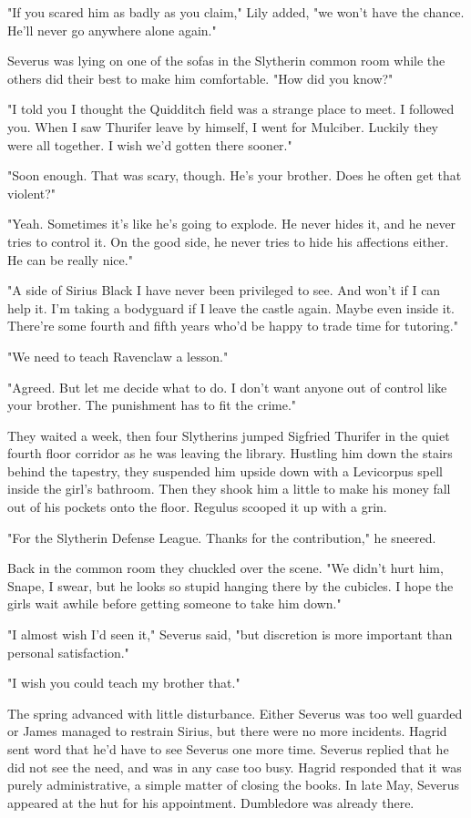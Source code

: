 "If you scared him as badly as you claim," Lily added, "we won't have the chance. He'll never go anywhere alone again."

Severus was lying on one of the sofas in the Slytherin common room while the others did their best to make him comfortable. "How did you know?"

"I told you I thought the Quidditch field was a strange place to meet. I followed you. When I saw Thurifer leave by himself, I went for Mulciber. Luckily they were all together. I wish we'd gotten there sooner."

"Soon enough. That was scary, though. He's your brother. Does he often get that violent?"

"Yeah. Sometimes it's like he's going to explode. He never hides it, and he never tries to control it. On the good side, he never tries to hide his affections either. He can be really nice."

"A side of Sirius Black I have never been privileged to see. And won't if I can help it. I'm taking a bodyguard if I leave the castle again. Maybe even inside it. There're some fourth and fifth years who'd be happy to trade time for tutoring."

"We need to teach Ravenclaw a lesson."

"Agreed. But let me decide what to do. I don't want anyone out of control like your brother. The punishment has to fit the crime."

They waited a week, then four Slytherins jumped Sigfried Thurifer in the quiet fourth floor corridor as he was leaving the library. Hustling him down the stairs behind the tapestry, they suspended him upside down with a Levicorpus spell inside the girl's bathroom. Then they shook him a little to make his money fall out of his pockets onto the floor. Regulus scooped it up with a grin.

"For the Slytherin Defense League. Thanks for the contribution," he sneered.

Back in the common room they chuckled over the scene. "We didn't hurt him, Snape, I swear, but he looks so stupid hanging there by the cubicles. I hope the girls wait awhile before getting someone to take him down."

"I almost wish I'd seen it," Severus said, "but discretion is more important than personal satisfaction."

"I wish you could teach my brother that."

The spring advanced with little disturbance. Either Severus was too well guarded or James managed to restrain Sirius, but there were no more incidents. Hagrid sent word that he'd have to see Severus one more time. Severus replied that he did not see the need, and was in any case too busy. Hagrid responded that it was purely administrative, a simple matter of closing the books. In late May, Severus appeared at the hut for his appointment. Dumbledore was already there.

